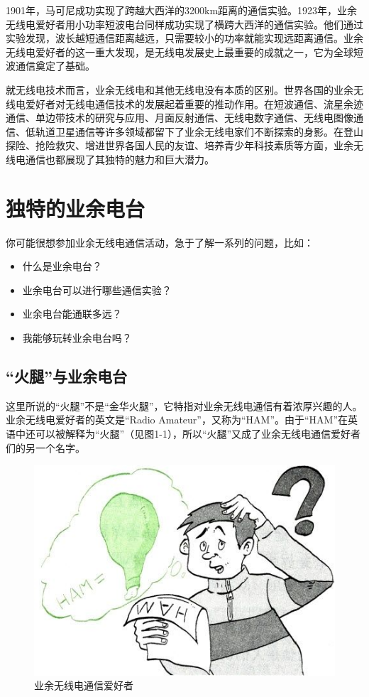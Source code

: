 \documentclass[12pt,UTF8]{ctexbook}
\begin{document}
1901年，马可尼成功实现了跨越大西洋的3200km距离的通信实验。1923年，业余无线电爱好者用小功率短波电台同样成功实现了横跨大西洋的通信实验。他们通过实验发现，波长越短通信距离越远，只需要较小的功率就能实现远距离通信。业余无线电爱好者的这一重大发现，是无线电发展史上最重要的成就之一，它为全球短波通信奠定了基础。

就无线电技术而言，业余无线电和其他无线电没有本质的区别。世界各国的业余无线电爱好者对无线电通信技术的发展起着重要的推动作用。在短波通信、流星余迹通信、单边带技术的研究与应用、月面反射通信、无线电数字通信、无线电图像通信、低轨道卫星通信等许多领域都留下了业余无线电家们不断探索的身影。在登山探险、抢险救灾、增进世界各国人民的友谊、培养青少年科技素质等方面，业余无线电通信也都展现了其独特的魅力和巨大潜力。

\section{独特的业余电台}

你可能很想参加业余无线电通信活动，急于了解一系列的问题，比如：

\begin{itemize}
	\item 什么是业余电台？
	\item 业余电台可以进行哪些通信实验？
	\item 业余电台能通联多远？
	\item 我能够玩转业余电台吗？
\end{itemize}  

\subsection{“火腿”与业余电台}

这里所说的“火腿”不是“金华火腿”，它特指对业余无线电通信有着浓厚兴趣的人。业余无线电爱好者的英文是“Radio Amateur”，又称为“HAM”。由于“HAM”在英语中还可以被解释为“火腿”（见图1-1），所以“火腿”又成了业余无线电通信爱好者们的另一个名字。

\begin{figure}[htbp]
	\centering
	\includegraphics[width=0.7\linewidth]{1}
	\caption{业余无线电通信爱好者}
	\label{fig:1}
\end{figure}
\end{document}
